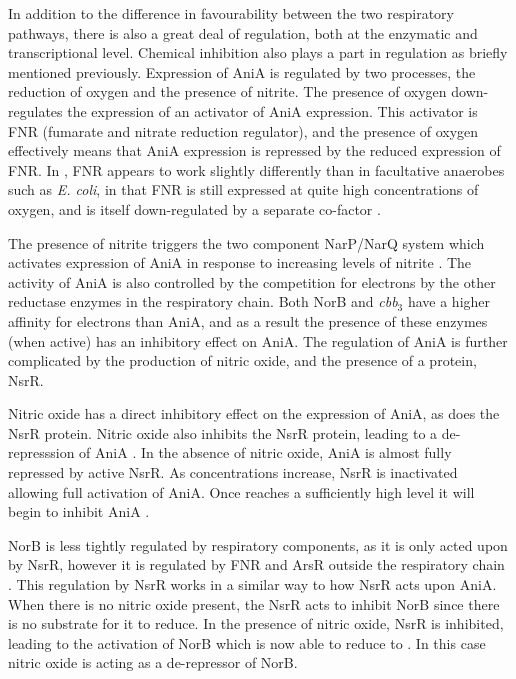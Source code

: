 In addition to the difference in favourability between the two respiratory pathways, there is also a great deal of regulation, both at the enzymatic and transcriptional level. Chemical inhibition also plays a part in regulation as briefly mentioned previously. Expression of AniA is regulated by two processes, the reduction of oxygen and the presence of nitrite. The presence of oxygen down-regulates the expression of an activator of AniA expression. This activator is FNR (fumarate and nitrate reduction regulator), and the presence of oxygen effectively means that AniA expression is repressed by the reduced expression of FNR. In \Nm, FNR appears to work slightly differently than in facultative anaerobes such as \textit{E. coli}, in that FNR is still expressed at quite high concentrations of oxygen, and is itself down-regulated by a separate co-factor \cite{Rock2007}.

The presence of nitrite triggers the two component NarP/NarQ system which activates expression of AniA in response to increasing levels of nitrite \cite{Rock2005}. The activity of AniA is also controlled by the competition for electrons by the other reductase enzymes in the respiratory chain. Both NorB and \textit{cbb$_{\textrm{3}}$} have a higher affinity for electrons than AniA, and as a result the presence of these enzymes (when active) has an inhibitory effect on AniA. The regulation of AniA is further complicated by the production of nitric oxide, and the presence of a protein, NsrR.

Nitric oxide has a direct inhibitory effect on the expression of AniA, as does the NsrR protein. Nitric oxide also inhibits the NsrR protein, leading to a de-represssion of AniA \cite{Heurlier2008}. In the absence of nitric oxide, AniA is almost fully repressed by active NsrR. As \cNO\space concentrations increase, NsrR is inactivated allowing full activation of AniA. Once \cNO\space reaches a sufficiently high level it will begin to inhibit AniA \cite{Rock2005,Rock2007}.

NorB is less tightly regulated by respiratory components, as it is only acted upon by NsrR, however it is regulated by FNR and ArsR outside the respiratory chain \cite{VincentIsabella01012008}. This regulation by NsrR works in a similar way to how NsrR acts upon AniA. When there is no nitric oxide present, the NsrR acts to inhibit NorB since there is no substrate for it to reduce. In the presence of nitric oxide, NsrR is inhibited, leading to the activation of NorB which is now able to reduce \cNO\space to \cNtwoO. In this case nitric oxide is acting as a de-repressor of NorB.

